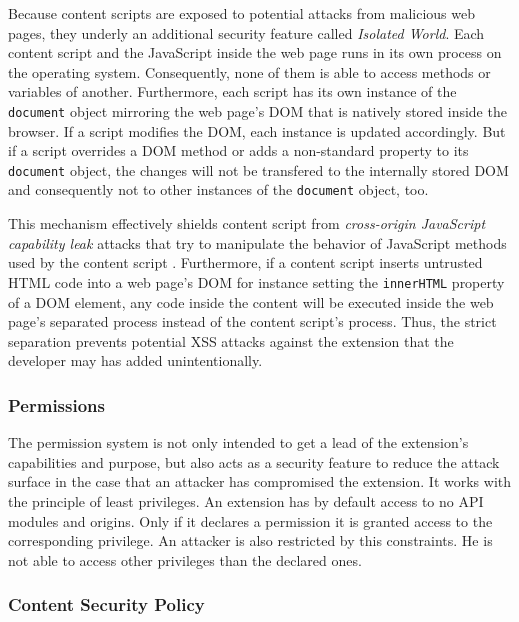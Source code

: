 	Because content scripts are exposed to potential attacks from malicious web pages, they underly an additional security feature called \textit{Isolated World}. Each content script and the JavaScript inside the web page runs in its own process on the operating system. Consequently, none of them is able to access methods or variables of another. Furthermore, each script has its own instance of the \texttt{document} object mirroring the web page's DOM that is natively stored inside the browser. If a script modifies the DOM, each instance is updated accordingly. But if a script overrides a DOM method or adds a non-standard property to its \texttt{document} object, the changes will not be transfered to the internally stored DOM and consequently not to other instances of the \texttt{document} object, too.	
	
	This mechanism effectively shields content script from \textit{cross-origin JavaScript capability leak} attacks that try to manipulate the behavior of JavaScript methods used by the content script \cite{Carlini:2012:EGC:2362793.2362800, Barth:2009:CJC:1855768.1855780}. Furthermore, if a content script inserts untrusted HTML code into a web page's DOM for instance setting the \texttt{innerHTML} property of a DOM element, any code inside the content will be executed inside the web page's separated process instead of the content script's process. Thus, the strict separation prevents potential XSS attacks against the extension that the developer may has added unintentionally.

\subsubsection{Permissions}

	The permission system is not only intended to get a lead of the extension's capabilities and purpose, but also acts as a security feature to reduce the attack surface in the case that an attacker has compromised the extension. It works with the principle of least privileges. An extension has by default access to no API modules and origins. Only if it declares a permission it is granted access to the corresponding privilege. An attacker is also restricted by this constraints. He is not able to access other privileges than the declared ones. 
	
\subsubsection{Content Security Policy}


